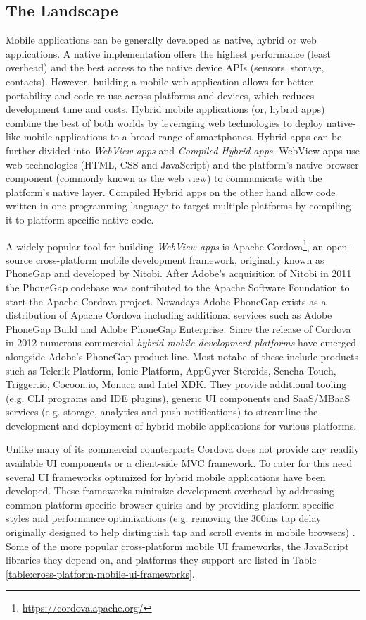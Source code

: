\documentclass[thesis.tex]{subfiles}
\begin{document}
\subsection{The Landscape}
Mobile applications can be generally developed as native, hybrid or web applications. A native implementation offers the highest performance (least overhead) and the best access to the native device APIs (sensors, storage, contacts). However, building a mobile web application allows for better portability and code re-use across platforms and devices, which reduces development time and costs. Hybrid mobile applications (or, hybrid apps) combine the best of both worlds by leveraging web technologies to deploy native-like mobile applications to a broad range of smartphones. Hybrid apps can be further divided into \textit{WebView apps} and \textit{Compiled Hybrid apps}. WebView apps use web technologies (HTML, CSS and JavaScript) and the platform's native browser component (commonly known as the web view) to communicate with the platform's native layer. Compiled Hybrid apps on the other hand allow code written in one programming language to target multiple platforms by compiling it to platform-specific native code.

A widely popular tool for building \textit{WebView apps} is Apache Cordova\footnote{\url{https://cordova.apache.org/}}, an open-source cross-platform mobile development framework, originally known as PhoneGap and developed by Nitobi. After Adobe's acquisition of Nitobi in 2011 the PhoneGap codebase was contributed to the Apache Software Foundation to start the Apache Cordova project. Nowadays Adobe PhoneGap exists as a distribution of Apache Cordova including additional services such as Adobe PhoneGap Build and Adobe PhoneGap Enterprise. Since the release of Cordova in 2012 numerous commercial \textit{hybrid mobile development platforms} have emerged alongside Adobe's PhoneGap product line. Most notabe of these include products such as Telerik Platform, Ionic Platform, AppGyver Steroids, Sencha Touch, Trigger.io, Cocoon.io, Monaca and Intel XDK. They provide additional tooling (e.g. CLI programs and IDE plugins), generic UI components and SaaS/MBaaS services (e.g. storage, analytics and push notifications) to streamline the development and deployment of hybrid mobile applications for various platforms.

Unlike many of its commercial counterparts Cordova does not provide any readily available UI components or a client-side MVC framework. To cater for this need several UI frameworks optimized for hybrid mobile applications have been developed. These frameworks minimize development overhead by addressing common platform-specific browser quirks and by providing platform-specific styles and performance optimizations (e.g. removing the 300ms tap delay originally designed to help distinguish tap and scroll events in mobile browsers) \cite{click_delay}. Some of the more popular cross-platform mobile UI frameworks, the JavaScript libraries they depend on, and platforms they support are listed in Table \ref{table:cross-platform-mobile-ui-frameworks}.
\end{document}
